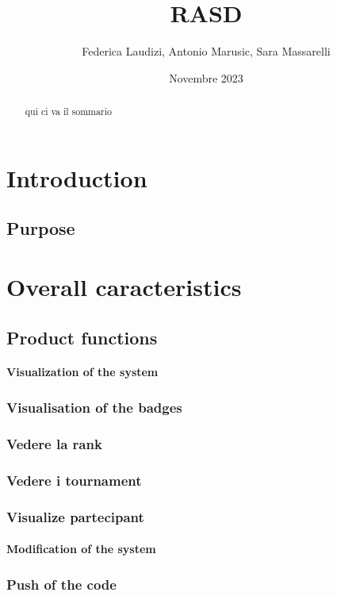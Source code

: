 \documentclass{article}
\title{RASD}
\author{Federica Laudizi, Antonio Marusic, Sara Massarelli}
\date{Novembre 2023}
\begin{document}
\maketitle

\tableofcontents

\begin{abstract}
    qui ci va il sommario
    \end{abstract}
    \section{Introduction} 
        \subsection{Purpose}

    \section{Overall caracteristics}
        \subsection{Product functions}
        \paragraph*{Visualization of the system}
            \subsubsection{Visualisation of the badges}
            \subsubsection{Vedere la rank}
            \subsubsection{Vedere i tournament}
            \subsubsection{Visualize partecipant}
        
        \paragraph*{Modification of the system}
            \subsubsection{Push of the code}
\end{document}
